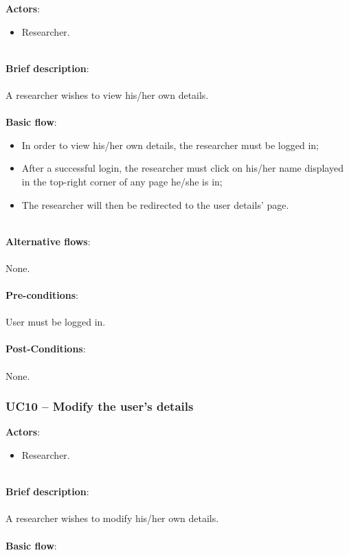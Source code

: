 \textbf{Actors}:

\begin{itemize}
\item Researcher.
\end{itemize}

\ \\
\textbf{Brief description}:\\
\ \\
A researcher wishes to view his/her own details.\\
\ \\
\textbf{Basic flow}:

\begin{itemize}
\item In order to view his/her own details, the researcher must be logged in;
\item After a successful login, the researcher must click on his/her name displayed in the top-right corner of any page he/she is in;
\item The researcher will then be redirected to the user details' page.
\end{itemize}

\ \\
\textbf{Alternative flows}:\\
\ \\
None.\\
\ \\
\textbf{Pre-conditions}:\\
\ \\
User must be logged in.\\
\ \\
\textbf{Post-Conditions}:\\
\ \\
None.

\subsubsection{UC10 -- Modify the user's details}\label{uc10}

\textbf{Actors}:

\begin{itemize}
\item Researcher.
\end{itemize}

\ \\
\textbf{Brief description}:\\
\ \\
A researcher wishes to modify his/her own details.\\
\ \\
\textbf{Basic flow}:

